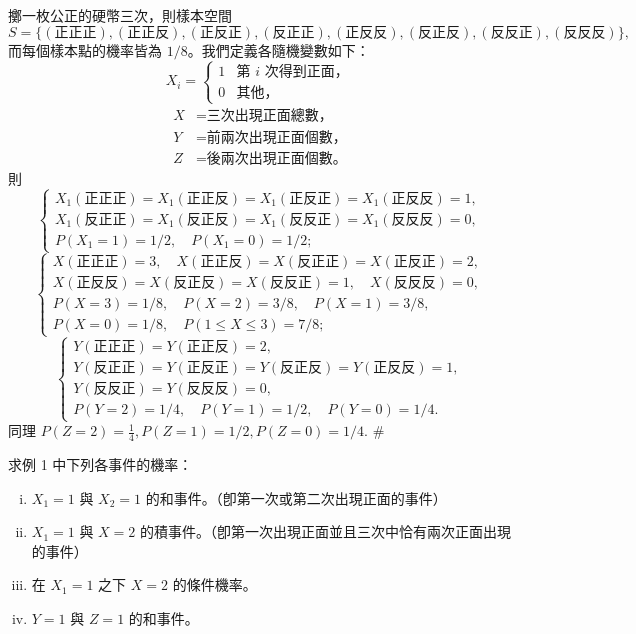 \medskip
\begin{example}\label{ex:b5s-5-1}
擲一枚公正的硬幣三次，則樣本空間
\[
S = \{(\text{正正正}), (\text{正正反}), (\text{正反正}), (\text{反正正}), (\text{正反反}), (\text{反正反}), (\text{反反正}), (\text{反反反})\},
\]
而每個樣本點的機率皆為 $1/8$。我們定義各隨機變數如下：
\[
X_i = \begin{cases}
1 & \text{第 $i$ 次得到正面，} \\
0 & \text{其他，}
\end{cases}
\]
\begin{align*}
X &= \text{三次出現正面總數，} \\
Y &= \text{前兩次出現正面個數，} \\
Z &= \text{後兩次出現正面個數。}
\end{align*}
則
\[
\begin{cases}
X_1(\text{正正正}) = X_1(\text{正正反}) = X_1(\text{正反正}) = X_1(\text{正反反}) = 1, \\
X_1(\text{反正正}) = X_1(\text{反正反}) = X_1(\text{反反正}) = X_1(\text{反反反}) = 0, \\
P(X_1 = 1) = 1/2, \quad P(X_1 = 0) = 1/2;
\end{cases}
\]
\[
\begin{cases}
X(\text{正正正}) = 3, \quad X(\text{正正反}) = X(\text{反正正}) = X(\text{正反正}) = 2, \\
X(\text{正反反}) = X(\text{反正反}) = X(\text{反反正}) = 1, \quad X(\text{反反反}) = 0, \\
P(X = 3) = 1/8, \quad P(X = 2) = 3/8, \quad P(X = 1) = 3/8, \\
P(X = 0) = 1/8, \quad P(1 \le X \le 3) = 7/8;
\end{cases}
\]
\[
\begin{cases}
Y(\text{正正正}) = Y(\text{正正反}) = 2, \\
Y(\text{反正正}) = Y(\text{正反正}) = Y(\text{反正反}) = Y(\text{正反反}) = 1, \\
Y(\text{反反正}) = Y(\text{反反反}) = 0, \\
P(Y = 2) = 1/4, \quad P(Y = 1) = 1/2, \quad P(Y = 0) = 1/4.
\end{cases}
\]
同理 $P(Z = 2) = \frac{1}{4}, P(Z = 1) = 1/2, P(Z = 0) = 1/4$. \hfill $\#$
\end{example}

\medskip
\begin{example}\label{ex:b5s-5-2}
求例 1 中下列各事件的機率：
\begin{enumerate}[(i)]
  \item $X_1 = 1$ 與 $X_2 = 1$ 的和事件。（卽第一次或第二次出現正面的事件）
  \item $X_1 = 1$ 與 $X = 2$ 的積事件。（卽第一次出現正面並且三次中恰有兩次正面出現的事件）
  \item 在 $X_1 = 1$ 之下 $X = 2$ 的條件機率。
  \item $Y = 1$ 與 $Z = 1$ 的和事件。
\end{enumerate}
\end{example}
